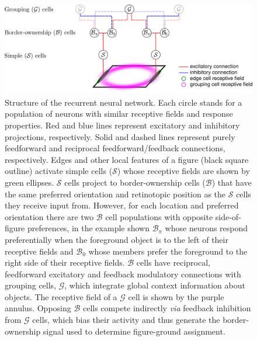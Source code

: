 \begin{figure}[t!]
\centering
\includegraphics[width=\textwidth]{NaturalImage/figs/model_circuit.png}
\makeatletter
\let\@currsize\normalsize
\caption[Structure of the recurrent neural network model for figure-ground organization of natural images]{Structure of the recurrent neural network. Each circle stands for a population of neurons with similar receptive fields and response properties. Red and blue lines represent excitatory and inhibitory projections, respectively. Solid and dashed lines represent purely feedforward and reciprocal feedforward/feedback connections, respectively. Edges and other local features of a figure (black square outline) activate simple cells ($\mathcal{S}$) whose receptive fields are shown by green ellipses. $\mathcal{S}$ cells project to border-ownership cells ($\mathcal{B}$) that have the same preferred orientation and retinotopic position as the $\mathcal{S}$ cells they receive input  from. However, for each location and preferred orientation there are  two $\mathcal{B}$ cell populations with opposite side-of-figure preferences, in the example shown $\mathcal{B}_{\pi}$ whose neurons respond preferentially when the foreground object is to the left of their receptive fields and $\mathcal{B}_{0}$ whose members prefer the foreground to the right side of their receptive fields. $\mathcal{B}$ cells have reciprocal, feedforward excitatory and feedback modulatory connections with grouping cells, $\mathcal{G}$, which integrate global context information about objects. The receptive field of a $\mathcal{G}$ cell is shown by the purple annulus. Opposing $\mathcal{B}$ cells compete indirectly {\em via} feedback inhibition  from $\mathcal{G}$ cells, which bias their activity and thus generate the border-ownership signal used to determine figure-ground assignment.}
\label{Fig:model}
\end{figure}

